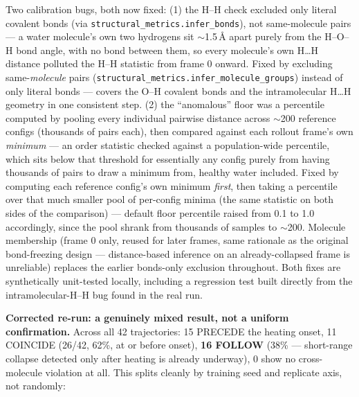 \documentclass[11pt]{article}
\begin{document}
Two calibration bugs, both now fixed: (1) the H--H check excluded only
literal covalent bonds (via \texttt{structural\_metrics.infer\_bonds}), not
same-molecule pairs --- a water molecule's own two hydrogens sit
$\sim$1.5\,\AA{} apart purely from the H--O--H bond angle, with no bond
between them, so every molecule's own H\ldots H distance polluted the H--H
statistic from frame 0 onward. Fixed by excluding same-\emph{molecule} pairs
(\texttt{structural\_metrics.infer\_molecule\_groups}) instead of only
literal bonds --- covers the O--H covalent bonds and the intramolecular
H\ldots H geometry in one consistent step. (2) the ``anomalous'' floor was a
percentile computed by pooling every individual pairwise distance across
$\sim$200 reference configs (thousands of pairs each), then compared against
each rollout frame's own \emph{minimum} --- an order statistic checked
against a population-wide percentile, which sits below that threshold for
essentially any config purely from having thousands of pairs to draw a
minimum from, healthy water included. Fixed by computing each reference
config's own minimum \emph{first}, then taking a percentile over that much
smaller pool of per-config minima (the same statistic on both sides of the
comparison) --- default floor percentile raised from 0.1 to 1.0 accordingly,
since the pool shrank from thousands of samples to $\sim$200. Molecule
membership (frame 0 only, reused for later frames, same rationale as the
original bond-freezing design --- distance-based inference on an
already-collapsed frame is unreliable) replaces the earlier bonds-only
exclusion throughout. Both fixes are synthetically unit-tested locally,
including a regression test built directly from the intramolecular-H--H bug
found in the real run.

\textbf{Corrected re-run: a genuinely mixed result, not a uniform
confirmation.} Across all 42 trajectories: 15 PRECEDE the heating onset, 11
COINCIDE (26/42, 62\%, at or before onset), \textbf{16 FOLLOW} (38\% ---
short-range collapse detected only after heating is already underway), 0
show no cross-molecule violation at all. This splits cleanly by training
seed and replicate axis, not randomly:
\end{document}
